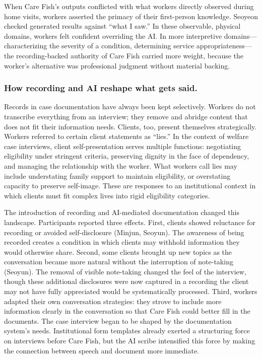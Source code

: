 \documentclass{article}
\begin{document}
When Care Fish's outputs conflicted with what workers directly observed during home visits, workers asserted the primacy of their first-person knowledge. Seoyeon checked generated results against ``what I saw.'' In these observable, physical domains, workers felt confident overriding the AI. In more interpretive domains---characterizing the severity of a condition, determining service appropriateness---the recording-backed authority of Care Fish carried more weight, because the worker's alternative was professional judgment without material backing.

\subsubsection{How recording and AI reshape what gets said.}

Records in case documentation have always been kept selectively. Workers do not transcribe everything from an interview; they remove and abridge content that does not fit their information needs. Clients, too, present themselves strategically. Workers referred to certain client statements as ``lies.'' In the context of welfare case interviews, client self-presentation serves multiple functions: negotiating eligibility under stringent criteria, preserving dignity in the face of dependency, and managing the relationship with the worker. What workers call lies may include understating family support to maintain eligibility, or overstating capacity to preserve self-image. These are responses to an institutional context in which clients must fit complex lives into rigid eligibility categories.

The introduction of recording and AI-mediated documentation changed this landscape. Participants reported three effects. First, clients showed reluctance for recording or avoided self-disclosure (Minjun, Seoyun). The awareness of being recorded creates a condition in which clients may withhold information they would otherwise share. Second, some clients brought up new topics as the conversation became more natural without the interruption of note-taking (Seoyun). The removal of visible note-taking changed the feel of the interview, though these additional disclosures were now captured in a recording the client may not have fully appreciated would be systematically processed. Third, workers adapted their own conversation strategies: they strove to include more information clearly in the conversation so that Care Fish could better fill in the documents. The case interview began to be shaped by the documentation system's needs. Institutional form templates already exerted a structuring force on interviews before Care Fish, but the AI scribe intensified this force by making the connection between speech and document more immediate.
\end{document}
